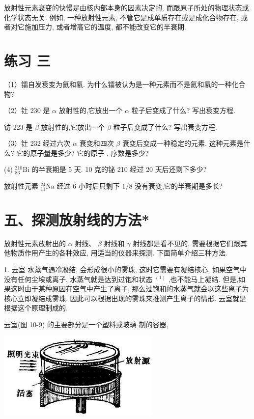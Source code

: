 \documentclass[10pt]{article}
\begin{document}
放射性元素衰变的快慢是由核内部本身的因素决定的, 而跟原子所处的物理状态或化学状态无关. 例如, 一种放射性元素, 不管它是成单质存在或是成化合物存在, 或者对它施加压力, 或者增高它的温度, 都不能改变它的半衰期.

\section*{练习 三}

（1）镭自发衰变为氦和氡. 为什么镭被认为是一种元素而不是氦和氡的一种化合物?

（2）钍 230 是 \(\alpha\) 放射性的,它放出一个 \(\alpha\) 粒子后变成了什么? 写出衰变方程.

钫 223 是 \(\beta\) 放射性的,它放出一个 \(\beta\) 粒子后变成了什么? 写出衰变方程.

（3）钍 232 经过六次 \(\alpha\) 衰变和四次 \(\beta\) 衰变后变成一种稳定的元素. 这种元素是什么? 它的原子量是多少? 它的原子 . 序数是多少?

(4) \({}_{83}^{210}\mathrm{{Bi}}\) 的半衰期是 5 天. 10 克的铋 210 经过 20 天后还剩下多少?

放射性元素 \({}_{11}^{24}\mathrm{{Na}}\) 经过 6 小时后只剩下 \(1/8\) 没有衰变,它的半衰期是多长?

\section*{五、探测放射线的方法*}

放射性元素放射出的 \(\alpha\) 射线、 \(\beta\) 射线和 \(\gamma\) 射线都是看不见的, 需要根据它们跟其他物质作用产生的各种效应, 用适当的仪器来探测. 下面简单介绍三种方法.

1. 云室 水蒸气遇冷凝结, 会形成很小的雾珠, 这时它需要有凝结核心, 如果空气中没有任何尘埃或离子, 水蒸气就是达到过饱和状态 \({}^{\left( 1\right) }\) ,也不能马上凝结. 但是,如果这时由于某种原因在空气中产生了离子, 那么过饱和的水蒸气就会以这些离子为核心立即凝结成雾珠. 因此可以根据出现的雾珠来推测产生离子的情形. 云室就是根据这个原理制成的.

云室(图 10-9) 的主要部分是一个塑料或玻璃 制的容器,

\begin{center}
\includegraphics[max width=0.6\textwidth]{images/01913056-1f15-74d8-9184-9aab52c9d66b_345_665873.jpg}
\end{center}
\end{document}
